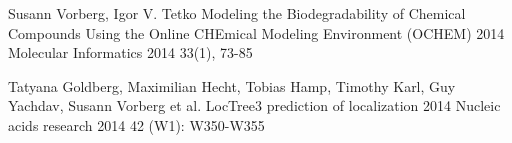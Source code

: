 
\begin{cventries}
  \cventry
  	{Susann Vorberg, Igor V. Tetko}
    {Modeling the Biodegradability of Chemical Compounds Using the Online CHEmical Modeling Environment (OCHEM)} 
	{}
	{2014}
	{Molecular Informatics 2014 33(1), 73-85 }
	

  \cventry
  	{Tatyana Goldberg, Maximilian Hecht, Tobias Hamp, Timothy Karl, Guy Yachdav, Susann Vorberg et al. }
    {LocTree3 prediction of localization} 
	{}
	{2014}
	{Nucleic acids research 2014 42 (W1): W350-W355}
	

	
\end{cventries}


